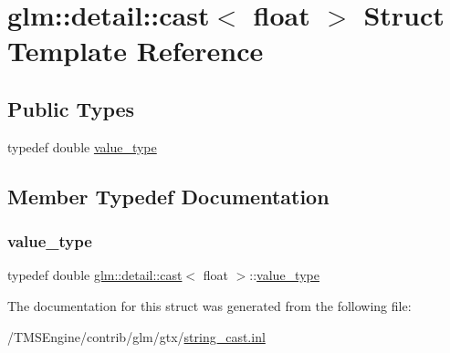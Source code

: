 \hypertarget{structglm_1_1detail_1_1cast_3_01float_01_4}{}\section{glm\+:\+:detail\+:\+:cast$<$ float $>$ Struct Template Reference}
\label{structglm_1_1detail_1_1cast_3_01float_01_4}
\subsection*{Public Types}
\begin{DoxyCompactItemize}
\item 
typedef double \hyperlink{structglm_1_1detail_1_1cast_3_01float_01_4_ada0eba4cef43496c87fbb3e3e42f1541}{value\+\_\+type}
\end{DoxyCompactItemize}


\subsection{Member Typedef Documentation}
\mbox{\label{structglm_1_1detail_1_1cast_3_01float_01_4_ada0eba4cef43496c87fbb3e3e42f1541}} 
\subsubsection{\texorpdfstring{value\+\_\+type}{value\_type}}
{\footnotesize\ttfamily typedef double \hyperlink{structglm_1_1detail_1_1cast}{glm\+::detail\+::cast}$<$ float $>$\+::\hyperlink{structglm_1_1detail_1_1cast_3_01float_01_4_ada0eba4cef43496c87fbb3e3e42f1541}{value\+\_\+type}}



The documentation for this struct was generated from the following file\+:\begin{DoxyCompactItemize}
\item 
/\+T\+M\+S\+Engine/contrib/glm/gtx/\hyperlink{string__cast_8inl}{string\+\_\+cast.\+inl}\end{DoxyCompactItemize}
